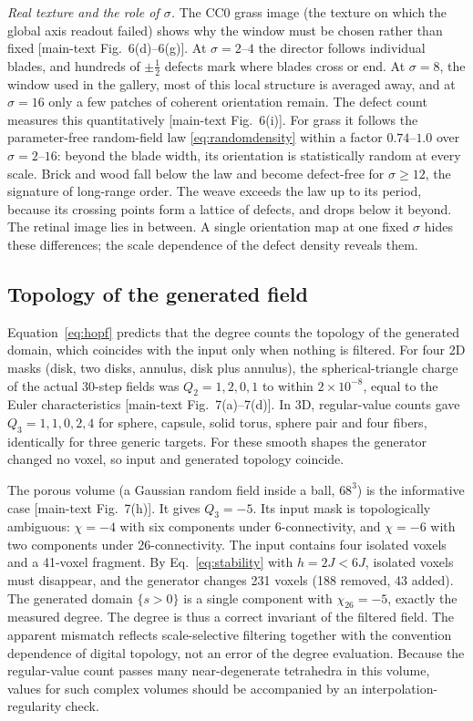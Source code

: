 \documentclass[11pt,a4paper]{article}
\begin{document}
\emph{Real texture and the role of $\sigma$.} The CC0 grass image (the texture on which the global axis readout failed) shows why the window must be chosen rather than fixed [main-text Fig.~6(d)--6(g)]. At $\sigma=2$--$4$ the director follows individual blades, and hundreds of $\pm\tfrac12$ defects mark where blades cross or end. At $\sigma=8$, the window used in the gallery, most of this local structure is averaged away, and at $\sigma=16$ only a few patches of coherent orientation remain. The defect count measures this quantitatively [main-text Fig.~6(i)]. For grass it follows the parameter-free random-field law \eqref{eq:randomdensity} within a factor $0.74$--$1.0$ over $\sigma=2$--$16$: beyond the blade width, its orientation is statistically random at every scale. Brick and wood fall below the law and become defect-free for $\sigma\ge12$, the signature of long-range order. The weave exceeds the law up to its period, because its crossing points form a lattice of defects, and drops below it beyond. The retinal image lies in between. A single orientation map at one fixed $\sigma$ hides these differences; the scale dependence of the defect density reveals them.



\subsection{Topology of the generated field}\label{subsec:topo}
Equation~\eqref{eq:hopf} predicts that the degree counts the topology of the generated domain, which coincides with the input only when nothing is filtered. For four 2D masks (disk, two disks, annulus, disk plus annulus), the spherical-triangle charge of the actual 30-step fields was $Q_2=1,2,0,1$ to within $2\times10^{-8}$, equal to the Euler characteristics [main-text Fig.~7(a)--7(d)]. In 3D, regular-value counts gave $Q_3=1,1,0,2,4$ for sphere, capsule, solid torus, sphere pair and four fibers, identically for three generic targets. For these smooth shapes the generator changed no voxel, so input and generated topology coincide.

The porous volume (a Gaussian random field inside a ball, $68^3$) is the informative case [main-text Fig.~7(h)]. It gives $Q_3=-5$. Its input mask is topologically ambiguous: $\chi=-4$ with six components under 6-connectivity, and $\chi=-6$ with two components under 26-connectivity. The input contains four isolated voxels and a 41-voxel fragment. By Eq.~\eqref{eq:stability} with $h=2J<6J$, isolated voxels must disappear, and the generator changes 231 voxels (188 removed, 43 added). The generated domain $\{s>0\}$ is a single component with $\chi_{26}=-5$, exactly the measured degree. The degree is thus a correct invariant of the filtered field. The apparent mismatch reflects scale-selective filtering together with the convention dependence of digital topology, not an error of the degree evaluation. Because the regular-value count passes many near-degenerate tetrahedra in this volume, values for such complex volumes should be accompanied by an interpolation-regularity check.
\end{document}
